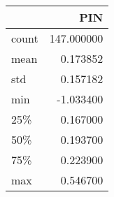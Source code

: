 \begin{tabular}{lr}
\toprule
{} &         PIN \\
\midrule
count &  147.000000 \\
mean  &    0.173852 \\
std   &    0.157182 \\
min   &   -1.033400 \\
25\%   &    0.167000 \\
50\%   &    0.193700 \\
75\%   &    0.223900 \\
max   &    0.546700 \\
\bottomrule
\end{tabular}
